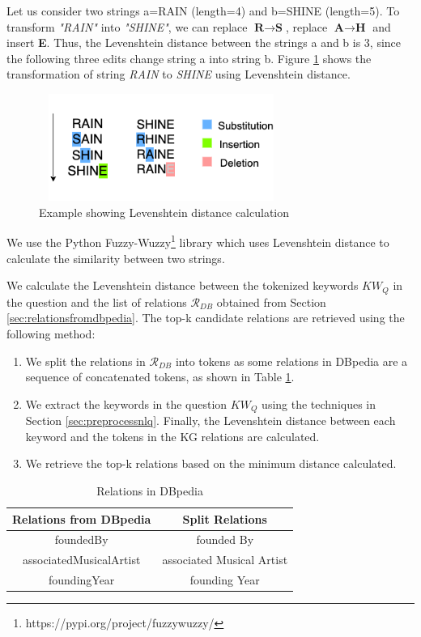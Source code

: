 Let us consider two strings a=RAIN (length=4) and b=SHINE (length=5). To transform \textit{"RAIN"} into \textit{"SHINE"}, we can replace $\textbf{R} \rightarrow \textbf{S}$, replace $\textbf{A} \rightarrow \textbf{H}$ and insert \textbf{E}. Thus, the Levenshtein distance between the strings a and b is 3, since the following three edits change string a into string b. Figure \ref{fig:Levenshtein} shows the transformation of string \textit{RAIN} to \textit{SHINE} using Levenshtein distance.

\begin{figure}
    \centering
   \includegraphics[width=8cm,height=3.5cm]{chapters/figures/Leven.png}
    \caption{Example showing Levenshtein distance calculation}
    \label{fig:Levenshtein}
\end{figure}

We use the Python Fuzzy-Wuzzy\footnote{https://pypi.org/project/fuzzywuzzy/} library which uses Levenshtein distance to calculate the similarity between two strings. 

We calculate the Levenshtein distance between the tokenized keywords $KW_{Q}$ in the question and the list of relations $\mathcal{R}_{DB}$ obtained from Section \ref{sec:relationsfromdbpedia}. 
The top-k candidate relations are retrieved using the following method: 
\begin{enumerate}
    \item We split the relations in $\mathcal{R}_{DB}$ into tokens as some relations in DBpedia are a sequence of concatenated tokens, as shown in Table \ref{tab:relations}.
    \item We extract the keywords in the question $KW_{Q}$ using the techniques in Section \ref{sec:preprocessnlq}. Finally, the Levenshtein distance between each keyword and the tokens in the KG relations are calculated.
    \item We retrieve the top-k relations based on the minimum distance calculated.
\end{enumerate}

\begin{table}[H]
    \centering
    \begin{tabular}{|c|c|}
     \hline
     \textbf{Relations from DBpedia} & \textbf{Split Relations} \\
    \hline
     foundedBy & founded By \\
    \hline
    associatedMusicalArtist & associated Musical Artist \\
    \hline
    foundingYear & founding Year \\
    \hline
    \end{tabular}
    \caption{Relations in DBpedia}
    \label{tab:relations}
\end{table}

